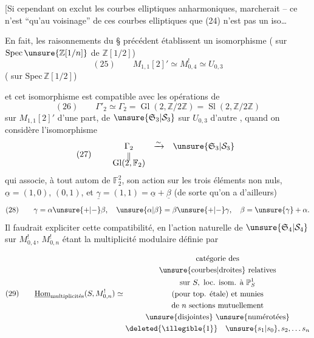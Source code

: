 [Si cependant on exclut les courbes elliptiques anharmoniques,  marcherait -- ce n'est ``qu'au voisinage'' de ces courbes elliptiques que (24) n'est pas un iso\ldots


En fait, les raisonnements du \S{} précédent établissent un isomorphisme ( sur  $\mathrm{Spec}\,\unsure{\mathbb Z[1/n]}$ de $\mathbb Z[1/2]$)
\[
(25)\qquad M_{1,1}[2]'\simeq M_{0,4}^{!}\simeq U_{0,3}
\]
( sur $\mathrm{Spec}\,\mathbb Z[1/2]$)


et cet isomorphisme est compatible avec les opérations de 
\[
(26)\qquad \Gamma'_2\simeq\Gamma_2=\operatorname{Gl}(2,\mathbb Z/2\mathbb Z)=\operatorname{Sl}(2,\mathbb Z/2\mathbb Z)
\]
sur $M_{1,1}[2]'$ d'une part, de $\unsure{\mathfrak S_3|\mathcal S_3}$ sur $U_{0,3}$ d'autre , quand on considère l'isomorphisme
\[
(27)\qquad
\begin{array}{ccc}
\Gamma_2 & \xrightarrow{\sim} & \unsure{\mathfrak S_3|\mathcal S_3}\\
\Vert &&\\[-4pt]
\operatorname{Gl}(2,\mathbb F_2)&&
\end{array}
\]
qui associe, à tout autom de $\mathbb F_2^2$, son action sur les trois éléments non nuls, $\underline{\alpha}=(1,0)$, \inserted{$\underline{\beta}=$}$(0,1)$, et $\underline{\gamma}=(1,1)=\underline{\alpha}+\underline{\beta}$ (de sorte qu'on a d'ailleurs) 
\[
(28)\qquad \gamma=\alpha\unsure{+|-}\beta,\quad \unsure{\alpha|\beta}=\beta\unsure{+|-}\gamma,\quad \beta=\unsure{\gamma}+\alpha.
\]
Il faudrait expliciter cette compatibilité, en  l'action naturelle de $\unsure{\mathfrak S_4|\mathcal S_4}$ sur $M_{0,4}^{!}$, $M_{0,n}^{!}$ étant la multiplicité modulaire définie par


\[
(29)\qquad
\underline{\operatorname{Hom}}_{\text{multiplicités}}(S,M_{0,n}^{!})\simeq
\begin{gathered}
\text{catégorie des}\\
\text{\unsure{courbes|droites} relatives}\\
\text{sur }S,\ \text{loc. isom. à }\mathbb P^1_S\\
\text{(pour top. étale) et munies}\\
\text{de }n\text{ sections mutuellement}\\
\text{\unsure{disjointes} \unsure{numérotées}}\\
\deleted{\illegible{1}}\quad\unsure{s_1|s_0},s_2,\ldots s_n
\end{gathered}
\]

